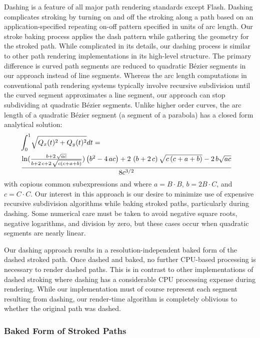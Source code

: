 Dashing is a feature of all major path rendering standards except Flash.
Dashing complicates stroking by turning on and off the stroking along
a path based on an application-specified repeating on-off pattern
specified in units of arc length.  Our stroke baking process applies
the dash pattern while gathering the geometry for the stroked path.
While complicated in its details, our dashing process is similar to other
path rendering implementations in its high-level structure.  The primary
difference is curved path segments are reduced to quadratic B\'{e}zier
segments in our approach instead of line segments.  Whereas the arc
length computations in conventional path rendering systems typically
involve recursive subdivision until the curved segment approximates
a line segment, our approach can stop subdividing at
quadratic B\'{e}zier segments.  Unlike higher order curves, the
arc length of a quadratic B\'{e}zier segment (a segment of a parabola)
has a closed form analytical solution:
\begin{eqnarray*}
\lefteqn{ \int _{0}^{1}\!\sqrt {Q_{x}(t)^{2}+ Q_{y}(t)^{2}}{dt} = } \\
&
\frac{\ln ({\frac {b+2\,\sqrt {ac}}{b+2\,c+2\,\sqrt {c\left (c+a+
b\right )}}})\left ({b}^{2}-4\,ac\right )+2\,\left (b+2\,c\right )
\sqrt {c\left (c+a+b\right )}-2\,b\sqrt {ac}}{8c^{3/2}}
\end{eqnarray*}
with copious common subexpressions and 
where $a=B \cdot B$, $b=2B \cdot C$, and $c=C \cdot C$.  Our interest in
this approach is our desire to minimize use of expensive recursive
subdivision algorithms while baking stroked paths, particularly during
dashing.  Some numerical care must be taken to avoid negative square
roots, negative logarithms, and division by zero, but these cases occur
when quadratic segments are nearly linear.

Our dashing approach results in a resolution-independent baked form of
the dashed stroked path.  Once dashed and baked, no further CPU-based
processing is necessary to render dashed paths.  This is in contrast to
other implementations of dashed stroking where dashing has a considerable
CPU processing expense during rendering.  While our implementation must
of course represent each segment resulting from dashing, our render-time
algorithm is completely oblivious to whether the original path was
dashed. 

\subsubsection{Baked Form of Stroked Paths}

